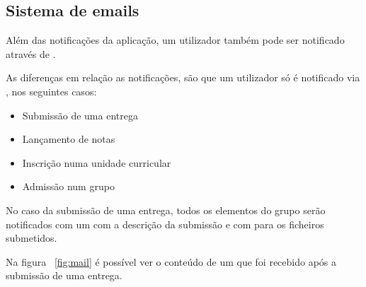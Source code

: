\subsection{Sistema de emails}

Além das notificações da aplicação, um utilizador também pode ser notificado através de .

As diferenças em relação as notificações, são que um utilizador só é notificado via , nos seguintes casos:

\begin{itemize}
	\item Submissão de uma entrega
	\item Lançamento de notas
	\item Inscrição numa unidade curricular
	\item Admissão num grupo
\end{itemize}

No caso da submissão de uma entrega, todos os elementos do grupo serão notificados com um  com a descrição da submissão e com  para os ficheiros submetidos.

Na figura ~\ref{fig:mail} é possível ver o conteúdo de um  que foi recebido após a submissão de uma entrega.
